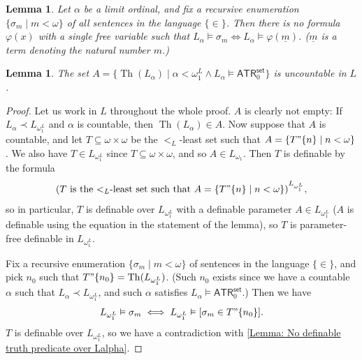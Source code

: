 \documentclass{amsart}
\newtheorem{lemma}[theorem]{Lemma}
\theoremstyle{remark}
\newcommand{\ATR}{\mathsf{ATR}}
\newcommand{\set}{\mathsf{set}}
\newcommand{\Th}{\operatorname{Th}}
\begin{document}
\begin{lemma} \label{Lemma: No definable truth predicate over Lalpha}
    Let $\alpha$ be a limit ordinal, and fix a recursive enumeration $\{\sigma_m\mid m<\omega\}$ of all sentences in the language $\{\in\}$. Then there is no formula $\varphi(x)$ with a single free variable such that $L_\alpha\vDash \sigma_m \iff L_\alpha\vDash\varphi(\underline{m})$. ($\underline{m}$ is a term denoting the natural number $m$.)
\end{lemma}

\begin{lemma} \label{Lemma: Cofinally many ordinals with different theories}
    The set $A = \{\Th(L_\alpha)\mid \alpha<\omega_1^L \land L_\alpha\vDash  \ATR_0^\set\}$ is uncountable in $L$.
\end{lemma}
\begin{proof}
    Let us work in $L$ throughout the whole proof.
    $A$ is clearly not empty: If $L_\alpha\prec L_{\omega_1^L}$ and $\alpha$ is countable, then $\Th(L_\alpha)\in A$. Now suppose that $A$ is countable, and let $T\subseteq \omega\times\omega$ be the $<_L$-least set such that $A=\{T"\{n\}\mid n<\omega\}$. We also have $T\in L_{\omega_1^L}$ since $T\subseteq\omega\times\omega$, and so $A\in L_{\omega_1}$. Then $T$ is definable by the formula
    \begin{equation*}
        (T \text{ is the $<_L$-least set such that $A = \{T"\{n\}\mid n<\omega\}$})^{L_{\omega_1^L}},
    \end{equation*}
    so in particular, $T$ is definable over $L_{\omega_1^L}$ with a definable parameter $A\in L_{\omega_1^L}$ ($A$ is definable using the equation in the statement of the lemma), so $T$ is parameter-free definable in $L_{\omega_1^L}$.
    
    Fix a recursive enumeration $\{\sigma_m\mid m<\omega\}$ of sentences in the language $\{\in\}$, and pick $n_0$ such that $T"\{n_0\}=\Th(L_{\omega_1^L})$. (Such $n_0$ exists since we have a countable $\alpha$ such that $L_\alpha\prec L_{\omega_1^L}$, and such $\alpha$ satisfies $L_\alpha\vDash \ATR_0^\set$.)
    Then we have
    \begin{equation*}
        L_{\omega_1^L}\vDash \sigma_m \iff L_{\omega_1^L}\vDash [\sigma_m\in T"\{n_0\}].
    \end{equation*}
    $T$ is definable over $L_{\omega_1^L}$, so we have a contradiction with \autoref{Lemma: No definable truth predicate over Lalpha}. 
\end{proof}
\end{document}
